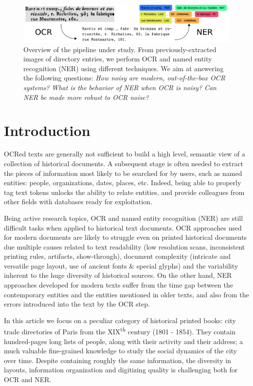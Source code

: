 \begin{figure}[!h]
    \centering
    \includegraphics[width=.9\textwidth]{figs/overview-intro.pdf}
    \caption{%
    Overview of the pipeline under study.
    From previously-extracted images of directory entries, 
    we perform OCR and named entity recognition (NER) using different techniques.
    We aim at answering the following questions:
    \emph{How noisy are modern, out-of-the-box OCR systems?}
    \emph{What is the behavior of NER when OCR is noisy?}
    \emph{Can NER be made more robust to OCR noise?}
    }
    \label{<label>}
\end{figure}
\clearpage%

\section{Introduction}

OCRed texts are generally not sufficient to build a high level, semantic view of a collection of historical documents.
A subsequent stage is often needed to extract the pieces of information most likely to be searched for by users, such as named entities: people, organizations, dates, places, etc.
Indeed, being able to properly tag text tokens unlocks the ability to relate entities, and provide colleagues from other fields with databases ready for exploitation.

Being active research topics, OCR and named entity recognition (NER) are still difficult tasks when applied to historical text documents.
OCR approaches used for modern documents are likely to struggle even on printed historical documents due multiple causes related to text readability (low resolution scans, inconsistent printing rules, artifacts, show-through), document complexity (intricate and versatile page layout, use of ancient fonts \& special glyphs) and the variability inherent to the huge diversity of historical sources.
On the other hand, NER approaches developed for modern texts suffer from the time gap between the contemporary entities and the entities mentioned in older texts, and also from the errors introduced into the text by the OCR step.

In this article we focus on a peculiar category of historical printed books: city trade directories of Paris from the XIX\textsuperscript{th} century (1801 - 1854).
They contain hundred-pages long lists of people, along with their activity and their address; a much valuable fine-grained knowledge to study the social dynamics of the city over time.
Despite containing roughly the same information, the diversity in layouts, information organization and digitizing quality is challenging both for OCR and NER.

